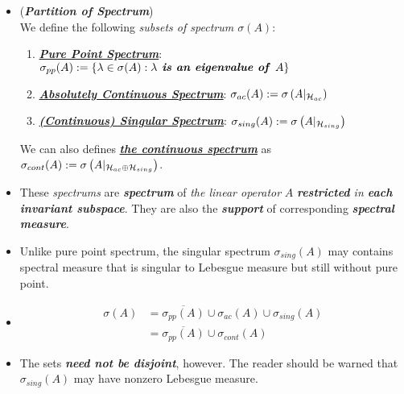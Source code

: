 \documentclass[11pt]{article}
\begin{document}
\begin{itemize}
\item \begin{definition}  (\textbf{\emph{Partition of Spectrum}})\\
We define the following \emph{subsets of spectrum $\sigma(A)$}:
\begin{enumerate}
\item \underline{\textbf{\emph{Pure Point Spectrum}}}: $\sigma_{pp}(A) := \left\{\lambda \in \sigma(A): \lambda \text{\emph{\textbf{ is an eigenvalue of }}}A\right\}$
\item \underline{\textbf{\emph{Absolutely Continuous Spectrum}}}: $\sigma_{ac}(A) := \sigma\left(A|_{{\mathcal H}_{ac}}\right)$
\item \underline{\textbf{\emph{(Continuous) Singular Spectrum}}}: $\sigma_{sing}(A) := \sigma\left(A|_{{\mathcal H}_{sing}}\right)$
\end{enumerate} We can also defines \underline{\textbf{\emph{the continuous spectrum}}} as $\sigma_{cont}(A) := \sigma\left(A|_{{\mathcal H}_{ac} \oplus {\mathcal H}_{sing}}\right)$.
\end{definition}

\item \begin{remark}
These \emph{spectrums} are \emph{\textbf{spectrum}} of \emph{the linear operator} $A$ \emph{\textbf{restricted} in \textbf{each invariant subspace}}. They are also  the \emph{\textbf{support}} of corresponding \emph{\textbf{spectral measure}}.
\end{remark}

\item \begin{remark}
Unlike pure point spectrum, the singular spectrum $\sigma_{sing}(A)$ may contains spectral measure that is singular to Lebesgue measure but still without pure point. 
\end{remark}

\item \begin{proposition} \citep{reed1980methods}
\begin{align*}
\sigma(A) &= \overline{\sigma_{pp}(A) } \cup \sigma_{ac}(A)  \cup \sigma_{sing}(A) \\
&= \overline{\sigma_{pp}(A) } \cup \sigma_{cont}(A) 
\end{align*}
\end{proposition}

\item \begin{remark}
The sets \emph{\textbf{need not be disjoint}}, however. The reader should be warned that $\sigma_{sing}(A)$ may have nonzero Lebesgue measure.
\end{remark}



\end{itemize}
\end{document}
